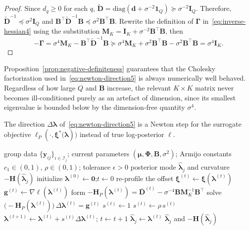 \begin{proof}
    Since $d_{q}\geq 0$ for each $q$, $\tilde{\mathbf{D}}=\text{diag}(\mathbf{d}+\sigma^{-2}\mathbf{1}_{Q})\succeq \sigma^{-2}\mathbf{I}_{Q}$. Therefore, $\tilde{\mathbf{D}}^{-1}\preceq \sigma^{2}\mathbf{I}_{Q}$ and $\mathbf{B}^{\top}\tilde{\mathbf{D}}^{-1}\mathbf{B}\preceq \sigma^{2}\mathbf{B}^{\top}\mathbf{B}$.
    Rewrite the definition of $\bm{\Gamma}$ in~\eqref{eq:inverse-hessian4} using the substitution $\mathbf{M}_{K}=\mathbf{I}_{K}+\sigma^{-2}\mathbf{B}^{\top}\mathbf{B}$, then
    \[
        -\bm{\Gamma}=\sigma^{4}\mathbf{M}_{K}-\mathbf{B}^{\top}\tilde{\mathbf{D}}^{-1}\mathbf{B}\succeq \sigma^{4}\mathbf{M}_{K}+\sigma^{2}\mathbf{B}^{\top}\mathbf{B}-\sigma^{2}\mathbf{B}^{\top}\mathbf{B}=\sigma^{4}\mathbf{I}_{K}.
    \]
\end{proof}

Proposition~\ref{prop:negative-definiteness} guarantees that the Cholesky factorization used in~\eqref{eq:newton-direction5} is always numerically well behaved. Regardless of how large $Q$ and $\mathbf{B}$ increase, the relevant $K\times K$ matrix never becomes ill-conditioned purely as an artefact of dimension, since its smallest eigenvalue is bounded below by the dimension-free quantity $\sigma^{4}$.

The direction $\Delta \bm{\lambda}$ of~\eqref{eq:newton-direction5} is a Newton step for the surrogate objective $\ell_{P}(\cdot, \bm{\xi}^{*}\bigl(\bm{\lambda})\bigr)$ instead of true log-posterior $\ell$.

\begin{algorithm}[t]
    \caption{E-step inner iteration: posterior-mode search for the group effect $\bm{\lambda}_j$}
    \label{alg:estep-inner}
    \begin{algorithmic}[1]
    \Require group data $\{\bm{y}_{ij}\}_{i\in\mathcal{I}_j}$; current parameters
         $(\bm{\mu},\bm{\Phi},\mathbf{B},\sigma^2)$; Armijo constants
         $c_1\in(0,1)$, $\rho\in(0,1)$; tolerance $\epsilon>0$
    \Ensure posterior mode $\widehat{\bm{\lambda}}_j$ and curvature $-\mathbf{H}(\widehat{\bm{\lambda}}_j)$
    \State initialize $\bm{\lambda}^{(0)}\gets \mathbf{0}$;\quad $t\gets 0$
    \Repeat
    \State re-profile the offset $\bm{\xi}^{(t)}\gets \bm{\xi}(\bm{\lambda}^{(t)})$
    \State $\mathbf{g}^{(t)}\gets \nabla\ell(\bm{\lambda}^{(t)})$
    \State form $-\mathbf{H}_P(\bm{\lambda}^{(t)})
         =\bar{\mathbf{D}}^{(t)}-\sigma^{-4}\mathbf{B}\mathbf{M}_K^{-1}\mathbf{B}^\top$
    \State solve $\bigl(-\mathbf{H}_P(\bm{\lambda}^{(t)})\bigr)\,\Delta\bm{\lambda}^{(t)}=\mathbf{g}^{(t)}$
    \State $s^{(t)}\gets 1$
    \State $s^{(t)}\gets \rho\,s^{(t)}$
    \EndWhile
    \State $\bm{\lambda}^{(t+1)}\gets \bm{\lambda}^{(t)}+s^{(t)}\Delta\bm{\lambda}^{(t)}$;\quad
         $t\gets t+1$
    \State $\widehat{\bm{\lambda}}_j\gets \bm{\lambda}^{(t)}$
    \State \Return $\widehat{\bm{\lambda}}_j$ and
       $-\mathbf{H}(\widehat{\bm{\lambda}}_j)$
    \end{algorithmic}
    \end{algorithm}

